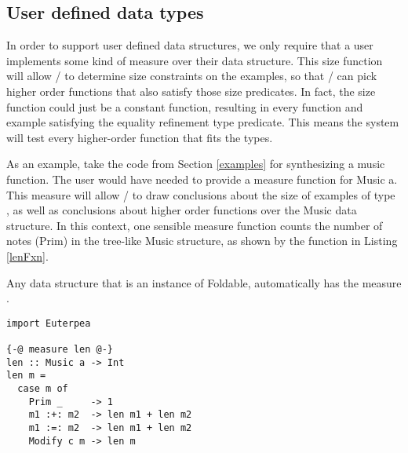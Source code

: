 \subsection{User defined data types}
In order to support user defined data structures, we only require that a user implements some kind of measure\cite{DBLP:conf/haskell/VazouSJ14} over their data structure.
This size function will allow \lhask/ to determine size constraints on the examples, so that \ourTool/ can pick higher order functions that also satisfy those size predicates.
In fact, the size function could just be a constant function, resulting in every function and example satisfying the equality refinement type predicate.
This means the system will test every higher-order function that fits the types.

As an example, take the code from Section \ref{examples} for synthesizing a music function.
The user would have needed to provide a measure function for Music a.
This measure will allow \lhask/ to draw conclusions about the size of examples of type , as well as conclusions about higher order functions over the Music data structure.
In this context, one sensible measure function counts the number of notes (Prim) in the tree-like Music structure, as shown by the  function in Listing \ref{lenFxn}.

Any data structure that is an instance of Foldable, automatically has the measure .

\begin{lstlisting}[caption=a user defined measure over a datatype,label=lenFxn]
import Euterpea

{-@ measure len @-}
len :: Music a -> Int
len m =
  case m of
    Prim _     -> 1
    m1 :+: m2  -> len m1 + len m2
    m1 :=: m2  -> len m1 + len m2
    Modify c m -> len m
\end{lstlisting}



